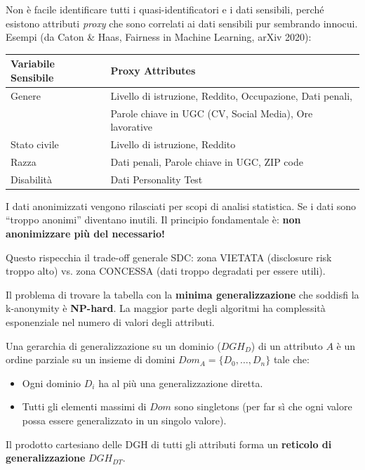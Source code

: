 \documentclass[a4paper,11pt]{article}
\begin{document}
\begin{nota}
Non \`{e} facile identificare tutti i quasi-identificatori e i dati sensibili, perch\'{e} esistono attributi \emph{proxy} che sono correlati ai dati sensibili pur sembrando innocui. Esempi (da Caton \& Haas, Fairness in Machine Learning, arXiv 2020):
\begin{center}
\begin{tabular}{ll}
\toprule
\textbf{Variabile Sensibile} & \textbf{Proxy Attributes} \\
\midrule
Genere & Livello di istruzione, Reddito, Occupazione, Dati penali, \\
       & Parole chiave in UGC (CV, Social Media), Ore lavorative \\
Stato civile & Livello di istruzione, Reddito \\
Razza & Dati penali, Parole chiave in UGC, ZIP code \\
Disabilit\`{a} & Dati Personality Test \\
\bottomrule
\end{tabular}
\end{center}
\end{nota}

\begin{nota}
I dati anonimizzati vengono rilasciati per scopi di analisi statistica. Se i dati sono ``troppo anonimi'' diventano inutili. Il principio fondamentale \`{e}: \textbf{non anonimizzare pi\`{u} del necessario!}

Questo rispecchia il trade-off generale SDC: zona VIETATA (disclosure risk troppo alto) vs. zona CONCESSA (dati troppo degradati per essere utili).
\end{nota}

Il problema di trovare la tabella con la \textbf{minima generalizzazione} che soddisfi la k-anonymity \`{e} \textbf{NP-hard}. La maggior parte degli algoritmi ha complessit\`{a} esponenziale nel numero di valori degli attributi.

\begin{definizione}
Una gerarchia di generalizzazione su un dominio ($DGH_D$) di un attributo $A$ \`{e} un ordine parziale su un insieme di domini $Dom_A = \{D_0, \ldots, D_n\}$ tale che:
\begin{itemize}
  \item Ogni dominio $D_i$ ha al pi\`{u} una generalizzazione diretta.
  \item Tutti gli elementi massimi di $Dom$ sono singletons (per far s\`{i} che ogni valore possa essere generalizzato in un singolo valore).
\end{itemize}
Il prodotto cartesiano delle DGH di tutti gli attributi forma un \textbf{reticolo di generalizzazione} $DGH_{DT}$.
\end{definizione}
\end{document}
